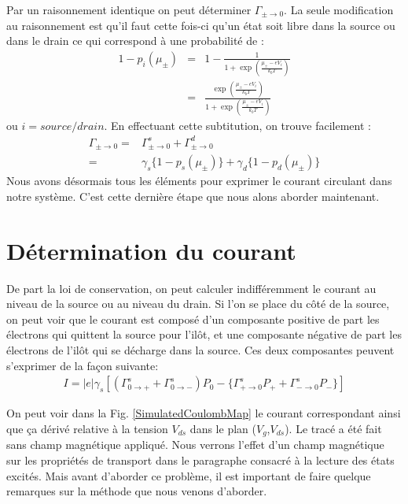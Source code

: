 Par un raisonnement identique on peut déterminer $\Gamma_{\pm \rightarrow 0}$. La seule modification au raisonnement est qu'il faut cette fois-ci qu'un état soit libre dans la source ou dans le drain ce qui correspond à une probabilité de :
\begin{eqnarray}
1 - p_i(\mu_\pm) &=& 1 - \frac{1}{1 + \exp{(\frac{\mu_\pm - eV_i}{k_bT})}} \nonumber \\
 &=& \frac{\exp{(\frac{\mu_\pm - eV_i}{k_bT})}}{1 + \exp{(\frac{\mu_\pm - eV_i}{k_bT})}}
\end{eqnarray}
ou $i=source/drain$.
En effectuant cette subtitution, on trouve facilement :
\begin{eqnarray}
\Gamma_{\pm \rightarrow 0} =& \Gamma_{\pm \rightarrow 0}^s + \Gamma_{\pm \rightarrow 0}^d  \nonumber \\
 =& \gamma_s \{1 - p_s(\mu_\pm)\} + \gamma_d \{1-p_d(\mu_\pm)\}
\end{eqnarray}
Nous avons désormais tous les éléments pour exprimer le courant circulant dans notre système. C'est cette dernière étape que nous alons aborder maintenant.
\section{Détermination du courant}
De part la loi de conservation, on peut calculer indifféremment le courant au niveau de la source ou au niveau du drain. Si l'on se place du c\^oté de la source, on peut voir que le courant est composé d'un composante positive de part les électrons qui quittent la source pour l'il\^ot, et une composante négative  de part les électrons de l'il\^ot qui se décharge dans la source. Ces deux composantes peuvent s'exprimer de la façon suivante:
\begin{eqnarray}
I = |e| \gamma_s [(\Gamma_{0 \rightarrow +}^s + \Gamma_{0 \rightarrow -}^s) P_0 - \{ \Gamma_{+ \rightarrow 0}^s P_{+} + \Gamma_{- \rightarrow 0}^s P_{-}  \}]
\end{eqnarray}


On peut voir dans la Fig. \ref{SimulatedCoulombMap} le courant correspondant ainsi que ça dérivé relative à la tension $V_{ds}$ dans le plan ($V_g$,$V_{ds}$). Le tracé a été fait sans champ magnétique appliqué. Nous verrons l'effet d'un champ magnétique sur les propriétés de transport dans le paragraphe consacré à la lecture des états excités. Mais avant d'aborder ce problème, il est important de faire quelque remarques sur la méthode que nous venons d'aborder.


